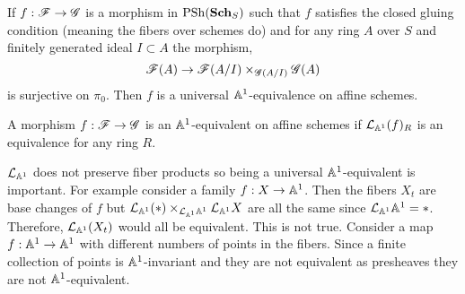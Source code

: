 \documentclass[12pt]{article}
\begin{document}
\begin{lemma}
If $f : \mathscr{F} \to \mathscr{G}$ is a morphism in $\mathrm{PSh}(\mathbf{Sch}_S)$ such that $f$ satisfies the closed gluing condition (meaning the fibers over schemes do) and for any ring $A$ over $S$ and finitely generated ideal $I \subset A$ the morphism,
\[ \mathscr{F}(A) \to \mathscr{F}(A/I) \times_{\mathscr{G}(A/I)} \mathscr{G}(A) \]
is surjective on $\pi_0$. Then $f$ is a universal $\mathbb{A}^1$-equivalence on affine schemes.
\end{lemma}

\begin{rmk}
A morphism $f : \mathscr{F} \to \mathscr{G}$ is an $\mathbb{A}^1$-equivalent on affine schemes if $\mathcal{L}_{\mathbb{A}^1}(f)_{R}$ is an equivalence for any ring $R$. 
\end{rmk}

\begin{rmk}
$\mathcal{L}_{\mathbb{A}^1}$ does not preserve fiber products so being a universal $\mathbb{A}^1$-equivalent is important. For example consider a family $f : X \to \mathbb{A}^1$. Then the fibers $X_t$ are base changes of $f$ but $\mathcal{L}_{\mathbb{A}^1} (*) \times_{\mathcal{L}_{\mathbb{A}^1} \mathbb{A}^1} \mathcal{L}_{\mathbb{A}^1} X$ are all the same since $\mathcal{L}_{\mathbb{A}^1} \mathbb{A}^1 = *$. Therefore, $\mathcal{L}_{\mathbb{A}^1} (X_t)$ would all be equivalent. This is not true. Consider a map $f : \mathbb{A}^1 \to \mathbb{A}^1$ with different numbers of points in the fibers. Since a finite collection of points is $\mathbb{A}^1$-invariant and they are not equivalent as presheaves they are not $\mathbb{A}^1$-equivalent. 
\end{rmk}
\end{document}
